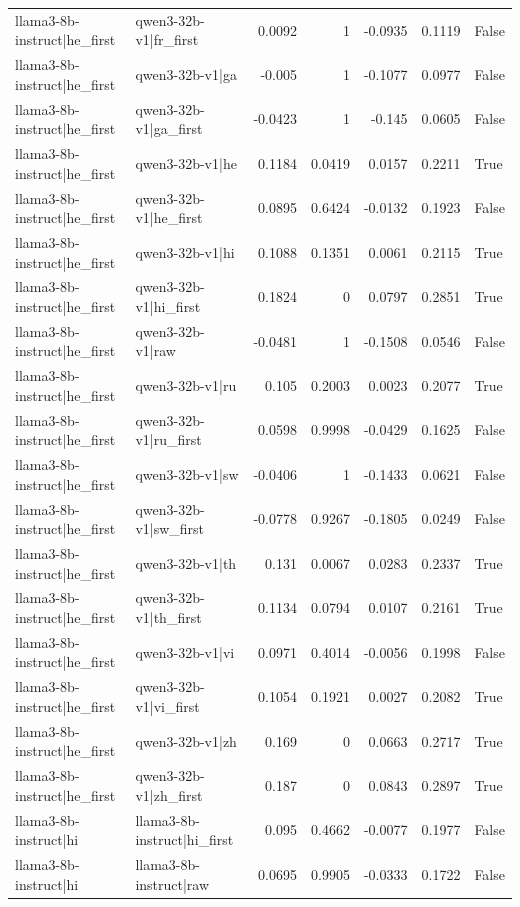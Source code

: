 \begin{table}
\begin{tabular}{l l r r r r l}
llama3-8b-instruct|he_first & qwen3-32b-v1|fr_first & 0.0092 & 1 & -0.0935 & 0.1119 & False \\
llama3-8b-instruct|he_first & qwen3-32b-v1|ga & -0.005 & 1 & -0.1077 & 0.0977 & False \\
llama3-8b-instruct|he_first & qwen3-32b-v1|ga_first & -0.0423 & 1 & -0.145 & 0.0605 & False \\
llama3-8b-instruct|he_first & qwen3-32b-v1|he & 0.1184 & 0.0419 & 0.0157 & 0.2211 & True \\
llama3-8b-instruct|he_first & qwen3-32b-v1|he_first & 0.0895 & 0.6424 & -0.0132 & 0.1923 & False \\
llama3-8b-instruct|he_first & qwen3-32b-v1|hi & 0.1088 & 0.1351 & 0.0061 & 0.2115 & True \\
llama3-8b-instruct|he_first & qwen3-32b-v1|hi_first & 0.1824 & 0 & 0.0797 & 0.2851 & True \\
llama3-8b-instruct|he_first & qwen3-32b-v1|raw & -0.0481 & 1 & -0.1508 & 0.0546 & False \\
llama3-8b-instruct|he_first & qwen3-32b-v1|ru & 0.105 & 0.2003 & 0.0023 & 0.2077 & True \\
llama3-8b-instruct|he_first & qwen3-32b-v1|ru_first & 0.0598 & 0.9998 & -0.0429 & 0.1625 & False \\
llama3-8b-instruct|he_first & qwen3-32b-v1|sw & -0.0406 & 1 & -0.1433 & 0.0621 & False \\
llama3-8b-instruct|he_first & qwen3-32b-v1|sw_first & -0.0778 & 0.9267 & -0.1805 & 0.0249 & False \\
llama3-8b-instruct|he_first & qwen3-32b-v1|th & 0.131 & 0.0067 & 0.0283 & 0.2337 & True \\
llama3-8b-instruct|he_first & qwen3-32b-v1|th_first & 0.1134 & 0.0794 & 0.0107 & 0.2161 & True \\
llama3-8b-instruct|he_first & qwen3-32b-v1|vi & 0.0971 & 0.4014 & -0.0056 & 0.1998 & False \\
llama3-8b-instruct|he_first & qwen3-32b-v1|vi_first & 0.1054 & 0.1921 & 0.0027 & 0.2082 & True \\
llama3-8b-instruct|he_first & qwen3-32b-v1|zh & 0.169 & 0 & 0.0663 & 0.2717 & True \\
llama3-8b-instruct|he_first & qwen3-32b-v1|zh_first & 0.187 & 0 & 0.0843 & 0.2897 & True \\
llama3-8b-instruct|hi & llama3-8b-instruct|hi_first & 0.095 & 0.4662 & -0.0077 & 0.1977 & False \\
llama3-8b-instruct|hi & llama3-8b-instruct|raw & 0.0695 & 0.9905 & -0.0333 & 0.1722 & False \\

\end{tabular}
\end{table}

